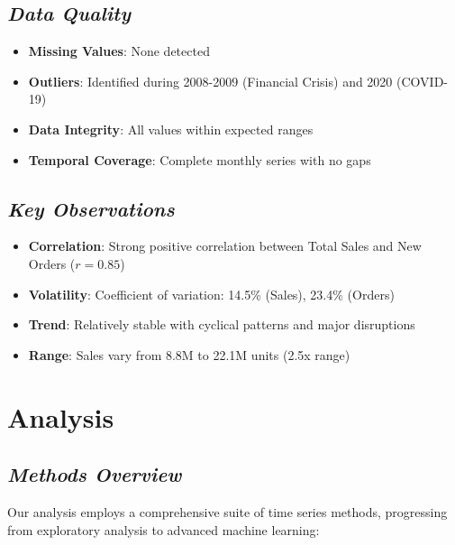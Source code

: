 \documentclass[12pt]{article}
\begin{document}
\subsection*{\textit{Data Quality}}

\begin{itemize}
    \item \textbf{Missing Values}: None detected
    \item \textbf{Outliers}: Identified during 2008-2009 (Financial Crisis) and 2020 (COVID-19)
    \item \textbf{Data Integrity}: All values within expected ranges
    \item \textbf{Temporal Coverage}: Complete monthly series with no gaps
\end{itemize}

\subsection*{\textit{Key Observations}}

\begin{itemize}
    \item \textbf{Correlation}: Strong positive correlation between Total Sales and New Orders ($r = 0.85$)
    \item \textbf{Volatility}: Coefficient of variation: 14.5\% (Sales), 23.4\% (Orders)
    \item \textbf{Trend}: Relatively stable with cyclical patterns and major disruptions
    \item \textbf{Range}: Sales vary from 8.8M to 22.1M units (2.5x range)
\end{itemize}

\section*{\textbf{Analysis}}

\subsection*{\textit{Methods Overview}}

Our analysis employs a comprehensive suite of time series methods, progressing from exploratory analysis to advanced machine learning:
\end{document}
